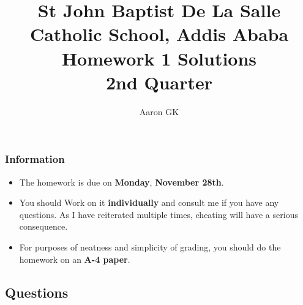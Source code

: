 \documentclass[9pt,addpoints]{exam}
\author{Aaron GK}
\begin{document}
	\title{St John Baptist De La Salle Catholic School, Addis Ababa\\
		\large Homework 1 Solutions\\
		2nd Quarter}
	\maketitle
	\begin{center}
		\subsubsection*{Information}
		\begin{itemize}
			\item The homework is due on \textbf{Monday}, \textbf{November 28th}.
			\item You should Work on it \textbf{individually} and consult me if you have any questions. As I have reiterated multiple times, cheating will have a serious consequence.
			\item For purposes of neatness and simplicity of grading, you should do the homework on an \textbf{A-4 paper}.
		\end{itemize}
	\end{center}
	\begin{center}
		\subsection*{Questions}
	\end{center}
	
\end{document}
